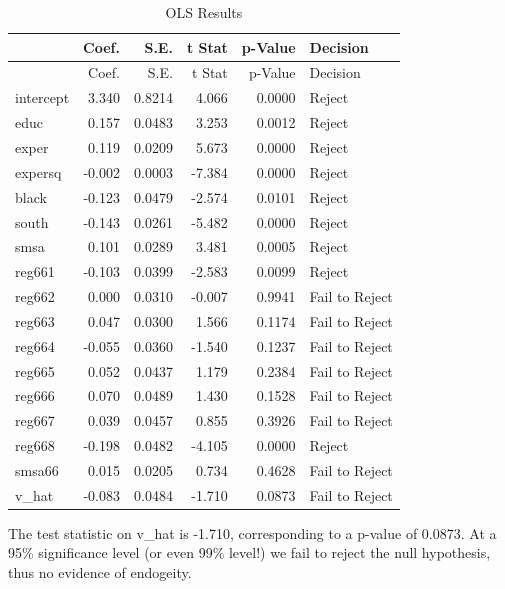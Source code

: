 \documentclass[11pt,]{article}
\newenvironment{Shaded}{\begin{snugshade}}{\end{snugshade}}
\newcommand{\CommentTok}[1]{\textcolor[rgb]{0.56,0.35,0.01}{\textit{#1}}}
\newcommand{\NormalTok}[1]{#1}
\begin{document}
\begin{longtable}[]{@{}lrrrrl@{}}
\caption{OLS Results}\tabularnewline
\toprule
& Coef. & S.E. & t Stat & p-Value & Decision\tabularnewline
\midrule
\endfirsthead
\toprule
& Coef. & S.E. & t Stat & p-Value & Decision\tabularnewline
\midrule
\endhead
intercept & 3.340 & 0.8214 & 4.066 & 0.0000 & Reject\tabularnewline
educ & 0.157 & 0.0483 & 3.253 & 0.0012 & Reject\tabularnewline
exper & 0.119 & 0.0209 & 5.673 & 0.0000 & Reject\tabularnewline
expersq & -0.002 & 0.0003 & -7.384 & 0.0000 & Reject\tabularnewline
black & -0.123 & 0.0479 & -2.574 & 0.0101 & Reject\tabularnewline
south & -0.143 & 0.0261 & -5.482 & 0.0000 & Reject\tabularnewline
smsa & 0.101 & 0.0289 & 3.481 & 0.0005 & Reject\tabularnewline
reg661 & -0.103 & 0.0399 & -2.583 & 0.0099 & Reject\tabularnewline
reg662 & 0.000 & 0.0310 & -0.007 & 0.9941 & Fail to
Reject\tabularnewline
reg663 & 0.047 & 0.0300 & 1.566 & 0.1174 & Fail to Reject\tabularnewline
reg664 & -0.055 & 0.0360 & -1.540 & 0.1237 & Fail to
Reject\tabularnewline
reg665 & 0.052 & 0.0437 & 1.179 & 0.2384 & Fail to Reject\tabularnewline
reg666 & 0.070 & 0.0489 & 1.430 & 0.1528 & Fail to Reject\tabularnewline
reg667 & 0.039 & 0.0457 & 0.855 & 0.3926 & Fail to Reject\tabularnewline
reg668 & -0.198 & 0.0482 & -4.105 & 0.0000 & Reject\tabularnewline
smsa66 & 0.015 & 0.0205 & 0.734 & 0.4628 & Fail to Reject\tabularnewline
v\_hat & -0.083 & 0.0484 & -1.710 & 0.0873 & Fail to
Reject\tabularnewline
\bottomrule
\end{longtable}

\begin{Shaded}
\end{Shaded}

The test statistic on v\_hat is -1.710, corresponding to a p-value of
0.0873. At a 95\% significance level (or even 99\% level!) we fail to
reject the null hypothesis, thus no evidence of endogeity.
\end{document}
